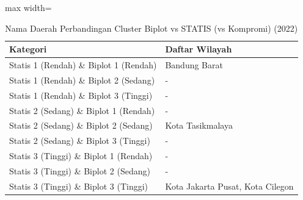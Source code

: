 \begin{table}[H]
\centering
\caption{Nama Daerah Perbandingan Cluster Biplot vs STATIS (vs Kompromi) (2022)} \label{tab:sample2biplot_statis_name_2022}
\begin{adjustbox}{max width=\textwidth}
\begin{tabular}{|p{4cm}|p{10cm}|}
\hline
\textbf{Kategori} & \textbf{Daftar Wilayah} \\
\hline
Statis 1 (Rendah) \& Biplot 1 (Rendah) & Bandung Barat \\
\hline
Statis 1 (Rendah) \& Biplot 2 (Sedang) & - \\
\hline
Statis 1 (Rendah) \& Biplot 3 (Tinggi) & - \\
\hline
Statis 2 (Sedang) \& Biplot 1 (Rendah) & - \\
\hline
Statis 2 (Sedang) \& Biplot 2 (Sedang) & Kota Tasikmalaya \\
\hline
Statis 2 (Sedang) \& Biplot 3 (Tinggi) & - \\
\hline
Statis 3 (Tinggi) \& Biplot 1 (Rendah) & - \\
\hline
Statis 3 (Tinggi) \& Biplot 2 (Sedang) & - \\
\hline
Statis 3 (Tinggi) \& Biplot 3 (Tinggi) & Kota Jakarta Pusat, Kota Cilegon \\
\hline
\end{tabular}
\end{adjustbox}
\end{table}